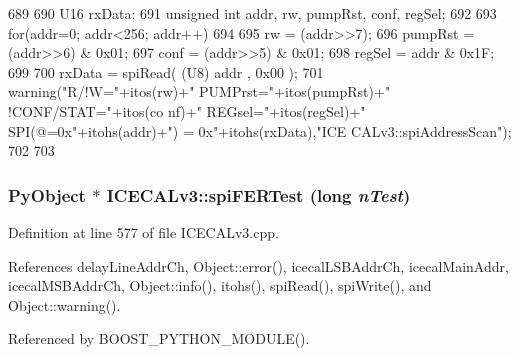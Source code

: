 \begin{DoxyCode}
689 {
690     U16 rxData;
691     unsigned int addr, rw, pumpRst, conf, regSel;
692 
693     for(addr=0; addr<256; addr++)
694     {
695         rw      = (addr>>7);
696         pumpRst = (addr>>6) & 0x01;
697         conf    = (addr>>5) & 0x01;
698         regSel  = addr & 0x1F;
699 
700         rxData = spiRead( (U8) addr , 0x00 );
701         warning("R/!W="+itos(rw)+" PUMPrst="+itos(pumpRst)+" !CONF/STAT="+itos(co
      nf)+" REGsel="+itos(regSel)+" ~ SPI(@=0x"+itohs(addr)+") = 0x"+itohs(rxData),"ICE
      CALv3::spiAddressScan");
702     }
703 }
\end{DoxyCode}
\hypertarget{classICECALv3_a8639cf6a44cba85b53128b5e1dc21e15}{
\subsubsection[{spiFERTest}]{\setlength{\rightskip}{0pt plus 5cm}PyObject $\ast$ ICECALv3::spiFERTest (long {\em nTest})}}
\label{classICECALv3_a8639cf6a44cba85b53128b5e1dc21e15}


Definition at line 577 of file ICECALv3.cpp.

References delayLineAddrCh, Object::error(), icecalLSBAddrCh, icecalMainAddr, icecalMSBAddrCh, Object::info(), itohs(), spiRead(), spiWrite(), and Object::warning().

Referenced by BOOST\_\-PYTHON\_\-MODULE().


